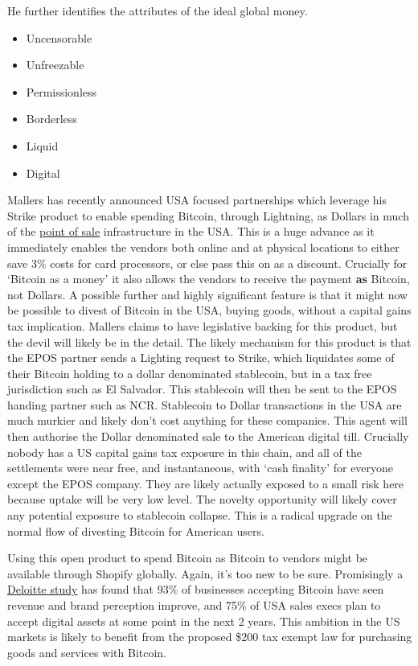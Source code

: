 He further identifies the attributes of the ideal global money. 
\begin{itemize}
\item Uncensorable
\item Unfreezable
\item Permissionless
\item Borderless
\item Liquid
\item Digital
\end{itemize}
Mallers has recently announced USA focused partnerships which leverage his Strike product to enable spending Bitcoin, through Lightning, as Dollars in much of the \href{https://www.ncr.com/point-of-sale-pos-systems}{point of sale} infrastructure in the USA. This is a huge advance as it immediately enables the vendors both online and at physical locations to either save 3\% costs for card processors, or else pass this on as a discount. Crucially for `Bitcoin as a money' it also allows the vendors to receive the payment \textbf{as} Bitcoin, not Dollars. A possible further and highly significant feature is that it might now be possible to divest of Bitcoin in the USA, buying goods, without a capital gains tax implication. Mallers claims to have legislative backing for this product, but the devil will likely be in the detail. The likely mechanism for this product is that the EPOS partner sends a Lighting request to Strike, which liquidates some of their Bitcoin holding to a dollar denominated stablecoin, but in a tax free jurisdiction such as El Salvador. This stablecoin will then be sent to the EPOS handing partner such as NCR. Stablecoin to Dollar transactions in the USA are much murkier and likely don't cost anything for these companies. This agent will then authorise the Dollar denominated sale to the American digital till. Crucially nobody has a US capital gains tax exposure in this chain, and all of the settlements were near free, and instantaneous, with `cash finality' for everyone except the EPOS company. They are likely actually exposed to a small risk here because uptake will be very low level. The novelty opportunity will likely cover any potential exposure to stablecoin collapse. This is a radical upgrade on the normal flow of divesting Bitcoin for American users. \par
Using this open product to spend Bitcoin as Bitcoin to vendors might be available through Shopify globally. Again, it's too new to be sure. Promisingly a \href{https://www2.deloitte.com/content/dam/Deloitte/us/Documents/technology/us-cons-merchant-getting-ready-for-crypto.pdf}{Deloitte study} has found that 93\% of businesses accepting Bitcoin have seen revenue and brand perception improve, and 75\% of USA sales execs plan to accept digital assets at some point in the next 2 years. This ambition in the US markets is likely to benefit from the proposed \$200 tax exempt law for purchasing goods and services with Bitcoin.\par

